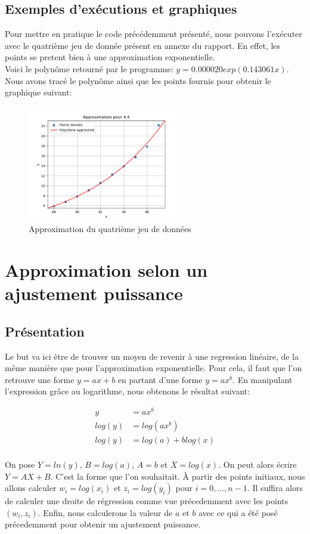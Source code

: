 \subsection{Exemples d'exécutions et graphiques}
Pour mettre en pratique le code précédemment présenté, nous pouvons l'exécuter avec le quatrième jeu de donnée présent en annexe du rapport. En effet, les points se pretent bien à une approximation exponentielle.\\
Voici le polynôme retourné par le programme: $y=0.000020exp(0.143061x)$. Nous avons tracé le polynôme ainsi que les points fournis pour obtenir le graphique suivant:\\
\begin{figure}[H]
    \centering
    \includegraphics[width=0.6\textwidth]{sources/Corentin/approximationC/results/graphs/44.png}
    \caption{Approximation du quatrième jeu de données}
\end{figure}
\section{Approximation selon un ajustement puissance}
\subsection{Présentation}
Le but va ici être de trouver un moyen de revenir à une regression linéaire, de la même manière que pour l'approximation exponentielle. Pour cela, il faut que l'on retrouve une forme $y=ax+b$ en partant d'une forme $y=ax^b$. En manipulant l'expression grâce au logarithme, nous obtenons le résultat suivant: \\
\begin{center}
    \begin{align*}
        y&=ax^b\\
        log(y)&=log(ax^b)\\
        log(y)&=log(a)+blog(x) \\
    \end{align*}
\end{center}
On pose $Y=ln(y)$, $B=log(a)$, $A=b$ et $X=log(x)$. On peut alors écrire $Y=AX+B$. C'est la forme que l'on souhaitait.
À partir des points initiaux, nous allons calculer $w_i=log(x_i)$ et $z_i=log(y_i)$ pour $i=0,..., n-1$. Il suffira alors de calculer une droite de régression comme vue précedemment avec les points $(w_i, z_i)$. Enfin, nous calculerons la valeur de $a$ et $b$ avec ce qui a été posé précedemment pour obtenir un ajustement puissance. 
\newpage
